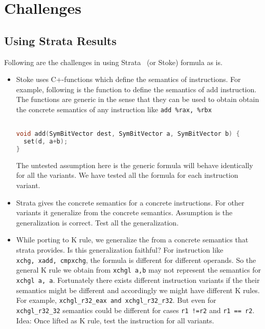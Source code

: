 \section{Challenges}

\subsection{Using Strata Results}
 Following are the challenges in using Strata~\cite{Heule2016a} (or Stoke) 
 formula as is.    
 
\begin{itemize}

  \item

    Stoke uses C+-functions which define the semantics of instructions. For
    example, following is the function to define the semantics of add
    instruction. The functions are generic in the sense that they can be used to
    obtain obtain the concrete semantics of any instruction like \texttt{add\
      \%rax,\ \%rbx}
  
\begin{lstlisting}[language=C]

void add(SymBitVector dest, SymBitVector a, SymBitVector b) {
  set(d, a+b);
}
  \end{lstlisting}
  
  The untested assumption here is the generic formula will behave identically
  for all the variants. We have tested all the formula for each instruction
  variant. 
  
  \item 

  Strata gives the concrete semantics for a concrete instructions. For other
  variants it generalize from the concrete semantics. Assumption is the
  generalization is correct. Test all the generalization.

  \item 

While porting to K rule, we generalize the from a concrete semantics that
strata provides. Is this generalization faithful? For instruction like
\texttt{xchg,\ xadd,\ cmpxchg}, the formula is different for different
operands. So the general K rule we obtain from \texttt{xchgl\ a,b} may not
represent the semantics for \texttt{xchgl\ a,\ a}. Fortunately there exists
different instruction variants if the their semantics might be different and
accordingly we might have different K rules. For example,
            \texttt{xchgl\_r32\_eax\ and\ xchgl\_r32\_r32}. But even for
            \texttt{xchgl\_r32\_32} semantics could be different for cases
            \texttt{r1\ !=r2} and \texttt{r1\ ==\ r2}. Idea: Once lifted as K
            rule, test the instruction for all variants.  
            
\end{itemize}

